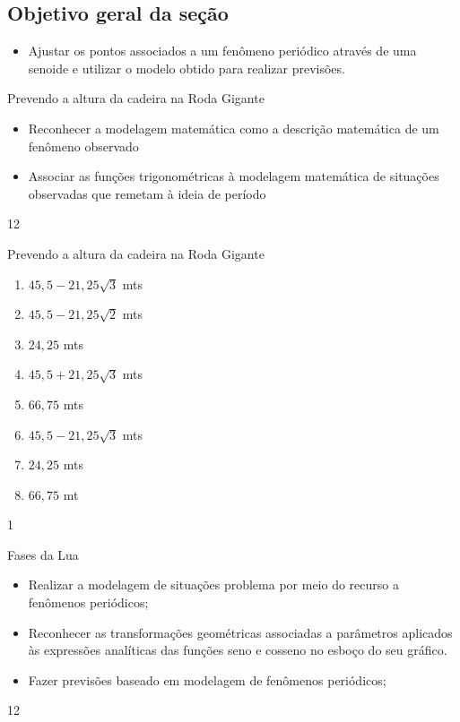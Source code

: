 \cleardoublepage
\def\currentcolor{session1}
\begin{texto}
{
	\subsection{Objetivo geral da seção}
	\begin{itemize}
	\item Ajustar os pontos associados a um fenômeno periódico através de uma senoide e utilizar o modelo obtido para realizar previsões.
	\end{itemize}
}
\end{texto}
\begin{objectives}{Prevendo a altura da cadeira na Roda Gigante}
{
\begin{itemize}
\item Reconhecer a modelagem matemática como a descrição matemática de um fenômeno observado
\item Associar as funções trigonométricas à modelagem matemática de situações observadas que remetam à ideia de período
\end{itemize}
}{1}{2}
\end{objectives}
\begin{answer}{Prevendo a altura da cadeira na Roda Gigante}
{
\begin{enumerate}
\item $45{,}5-21,25\sqrt{3}$ mts
\item $45{,}5-21,25\sqrt{2}$ mts
\item $24{,}25$ mts
\item $45{,}5+21,25\sqrt{3}$ mts
\item $66{,}75$ mts
\item $45{,}5-21,25\sqrt{3}$ mts
\item $24{,}25$ mts
\item $66{,}75$ mt
\end{enumerate}
}{1}
\end{answer}
\clearmargin
\begin{objectives}{Fases da Lua}
{
\begin{itemize}
\item Realizar a modelagem de situações problema por meio do
recurso a fenômenos periódicos;
\item Reconhecer as transformações geométricas associadas a
parâmetros aplicados às expressões analíticas das funções
seno e cosseno no esboço do seu gráfico.
\item Fazer previsões baseado em modelagem de fenômenos
periódicos;
\end{itemize}
}{1}{2}
\end{objectives}
